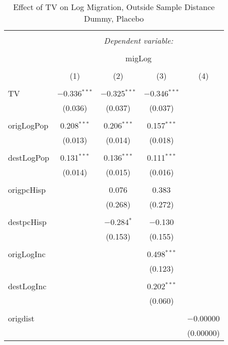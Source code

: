 
\begin{table}[!htbp] \centering 
  \caption{Effect of TV on Log Migration, Outside Sample Distance Dummy, Placebo} 
  \label{} 
\begin{tabular}{@{\extracolsep{5pt}}lcccc} 
\\[-1.8ex]\hline 
\hline \\[-1.8ex] 
 & \multicolumn{4}{c}{\textit{Dependent variable:}} \\ 
\cline{2-5} 
\\[-1.8ex] & \multicolumn{4}{c}{migLog} \\ 
\\[-1.8ex] & (1) & (2) & (3) & (4)\\ 
\hline \\[-1.8ex] 
 TV & $-$0.336$^{***}$ & $-$0.325$^{***}$ & $-$0.346$^{***}$ &  \\ 
  & (0.036) & (0.037) & (0.037) &  \\ 
  & & & & \\ 
 origLogPop & 0.208$^{***}$ & 0.206$^{***}$ & 0.157$^{***}$ &  \\ 
  & (0.013) & (0.014) & (0.018) &  \\ 
  & & & & \\ 
 destLogPop & 0.131$^{***}$ & 0.136$^{***}$ & 0.111$^{***}$ &  \\ 
  & (0.014) & (0.015) & (0.016) &  \\ 
  & & & & \\ 
 origpcHisp &  & 0.076 & 0.383 &  \\ 
  &  & (0.268) & (0.272) &  \\ 
  & & & & \\ 
 destpcHisp &  & $-$0.284$^{*}$ & $-$0.130 &  \\ 
  &  & (0.153) & (0.155) &  \\ 
  & & & & \\ 
 origLogInc &  &  & 0.498$^{***}$ &  \\ 
  &  &  & (0.123) &  \\ 
  & & & & \\ 
 destLogInc &  &  & 0.202$^{***}$ &  \\ 
  &  &  & (0.060) &  \\ 
  & & & & \\ 
 origdist &  &  &  & $-$0.00000 \\ 
  &  &  &  & (0.00000) \\ 

\end{tabular}
\end{table}
